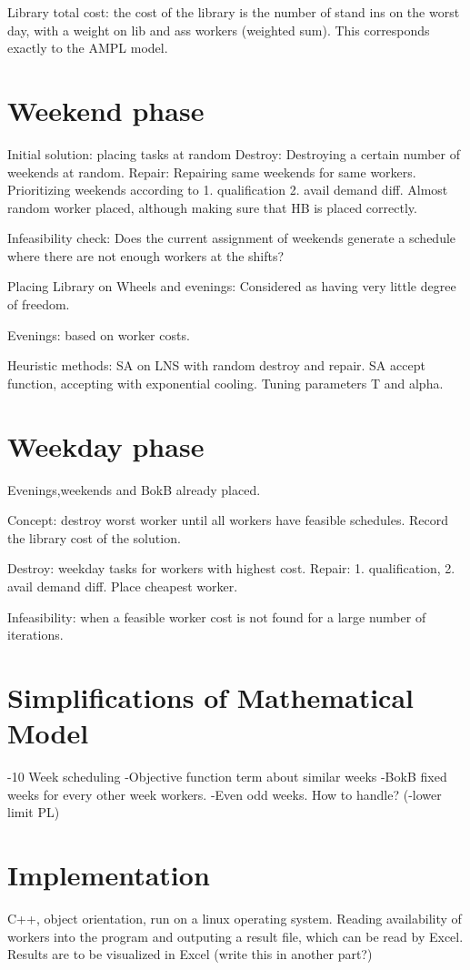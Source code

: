 Library total cost: the cost of the library is the number of stand ins on the worst day, with a weight on lib and ass workers (weighted sum). This corresponds exactly to the AMPL model.

\section{Weekend phase}
Initial solution: placing tasks at random
Destroy: Destroying a certain number of weekends at random.
Repair: Repairing same weekends for same workers. Prioritizing weekends according to 1. qualification 2. avail demand diff. Almost random worker placed, although making sure that HB is placed correctly.

Infeasibility check: Does the current assignment of weekends generate a schedule where there are not enough workers at the shifts?

Placing Library on Wheels and evenings: Considered as having very little degree of freedom. 

Evenings: based on worker costs.

Heuristic methods: SA on LNS with random destroy and repair. SA accept function, accepting with exponential cooling. Tuning parameters T and alpha.

\section{Weekday phase}
Evenings,weekends and BokB already placed. 

Concept: destroy worst worker until all workers have feasible schedules. Record the library cost of the solution. 

Destroy: weekday tasks for workers with highest cost.
Repair: 1. qualification, 2. avail demand diff. Place cheapest worker.

Infeasibility: when a feasible worker cost is not found for a large number of iterations. 

\section{Simplifications of Mathematical Model}
-10 Week scheduling
-Objective function term about similar weeks
-BokB fixed weeks for every other week workers.
-Even odd weeks. How to handle?
(-lower limit PL)

\section{Implementation}
C++, object orientation, run on a linux operating system. Reading availability of workers into the program and outputing a result file, which can be read by Excel. Results are to be visualized in Excel (write this in another part?)
